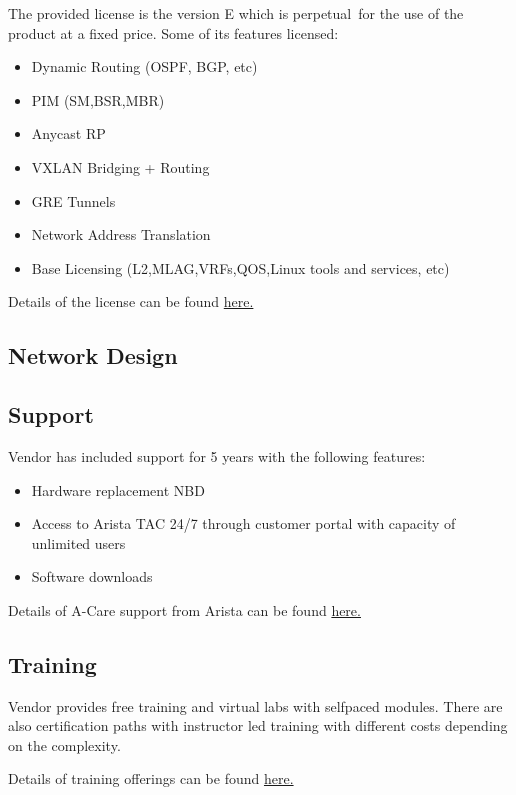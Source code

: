 The provided license is the version E which is perpetual for the use of the product at a fixed price. Some of its features licensed:

\begin{itemize}
  \item Dynamic Routing (OSPF, BGP, etc)
  \item PIM (SM,BSR,MBR)
  \item Anycast RP
  \item VXLAN Bridging + Routing
  \item GRE Tunnels
  \item Network Address Translation
  \item Base Licensing (L2,MLAG,VRFs,QOS,Linux tools and services, etc)
\end{itemize}

Details of the license can be found \href{https://www.arista.com/en/support/product-documentation/eos-feature-licensing}{here.}


\subsection{Network Design}
\subsection{Support}

Vendor has included support for 5 years with the following features:
\begin{itemize}
  \item Hardware replacement NBD
  \item Access to Arista TAC 24/7 through customer portal with capacity of unlimited users
  \item Software downloads
\end{itemize}

Details of A-Care support from Arista can be found \href{https://www.arista.com/assets/data/pdf/A-CareServicesOverview.pdf}{here.}

\subsection{Training}

Vendor provides free training and virtual labs with selfpaced modules. There are also certification paths with instructor led training with different costs depending on the complexity.

Details of training offerings can be found \href{https://www.arista.com/en/support/hands-on-training}{here.}


